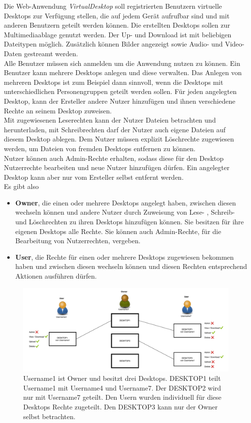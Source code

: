 \documentclass[a4paper, 12pt]{scrreprt}
\renewcommand\_{\textunderscore\allowbreak}
\begin{document}
Die Web-Anwendung \textit{VirtualDesktop} soll registrierten Benutzern virtuelle Desktops zur Verfügung stellen, die auf jedem Gerät aufrufbar sind und mit anderen Benutzern geteilt werden können. Die erstellten Desktops sollen zur Multimediaablage genutzt werden. Der Up- und Download ist mit beliebigen Dateitypen möglich. Zusätzlich können Bilder angezeigt sowie Audio- und Video-Daten gestreamt werden.\\[0.25cm]
Alle Benutzer müssen sich anmelden um die Anwendung nutzen zu können. Ein Benutzer kann mehrere Desktops anlegen und diese verwalten. Das Anlegen von mehreren Desktops ist zum Beispiel dann sinnvoll, wenn die Desktops mit unterschiedlichen Personengruppen geteilt werden sollen.
Für jeden angelegten Desktop, kann der Ersteller andere Nutzer hinzufügen und ihnen verschiedene Rechte an seinem Desktop zuweisen.\\
Mit zugewiesenen Leserechten kann der Nutzer Dateien betrachten und herunterladen, mit Schreibrechten darf der Nutzer auch eigene Dateien auf diesem Desktop ablegen. Dem Nutzer müssen explizit Löschrechte zugewiesen werden, um Dateien von fremden Desktops entfernen zu können.\\
Nutzer können auch Admin-Rechte erhalten, sodass diese für den Desktop Nutzerrechte bearbeiten und neue Nutzer hinzufügen dürfen. Ein angelegter Desktop kann aber nur vom Ersteller selbst entfernt werden.\\ 
Es gibt also
\begin{itemize} 
\item[] \textbf{Owner}, die einen oder mehrere Desktops angelegt haben, zwischen diesen wechseln können und andere Nutzer durch Zuweisung von Lese- , Schreib- und Löschrechten zu ihren Desktops hinzufügen können. Sie besitzen für ihre eigenen Desktops alle Rechte. Sie können auch Admin-Rechte, für die Bearbeitung von Nutzerrechten, vergeben.
\item[] \textbf{User}, die Rechte für einen oder mehrere Desktops zugewiesen bekommen haben und zwischen diesen wechseln können und diesen Rechten entsprechend Aktionen ausführen dürfen.
\end{itemize} 

\begin{figure}[H]
\centering
\includegraphics[scale=0.4]{VD_konzept.pdf}
\caption{Username1 ist Owner und besitzt drei Desktops. DESKTOP1 teilt Username1 mit Username4 und Username7. Der DESKTOP2 wird nur mit Username7 geteilt. Den Usern wurden individuell für diese Desktops Rechte zugeteilt. Den DESKTOP3 kann nur der Owner selbst betrachten.}
\end{figure}
\end{document}
